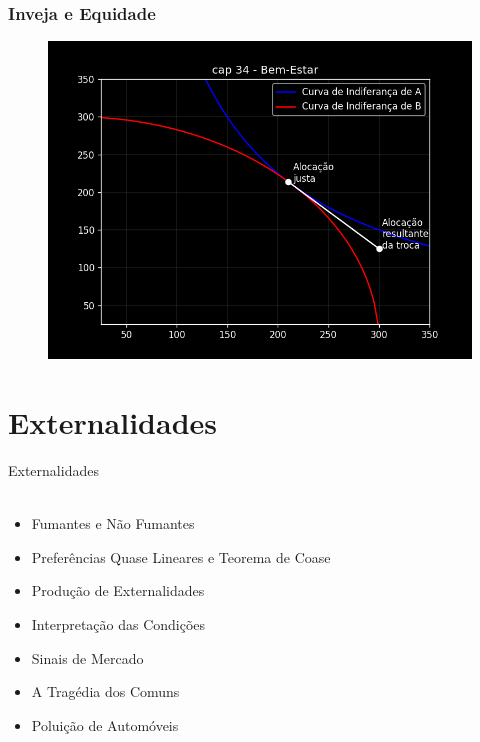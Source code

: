 \documentclass{beamer}[10]
\begin{document}
\begin{frame}
	\frametitle{Inveja e Equidade}

	\begin{figure}[H]
		\centering
		\includegraphics[scale=0.55]{cap34_6-inveja_equidade.png}
	\end{figure}

\end{frame}

\section[Externalidades]{Externalidades}
\begin{frame}
	\huge Externalidades \normalsize
	\\~\\
	\begin{itemize}
		\item Fumantes e Não Fumantes
		\item Preferências Quase Lineares e Teorema de Coase
		\item Produção de Externalidades
		\item Interpretação das Condições
		\item Sinais de Mercado
		\item A Tragédia dos Comuns
		\item Poluição de Automóveis
	\end{itemize}
\end{frame}
\end{document}
